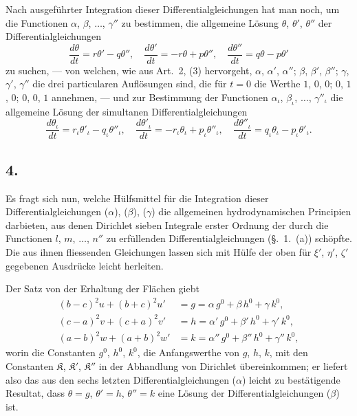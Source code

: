 \documentclass[12pt,a4paper]{article}
\begin{document}
Nach ausgeführter Integration dieser Differentialgleichungen hat man noch, um die Functionen $\alpha$, $\beta$, $\ldots$, $\gamma''$ zu bestimmen, die allgemeine Lösung $\theta$, $\theta'$, $\theta''$ der Differentialgleichungen
\begin{equation}
\tag{$\beta$}
\frac{d\theta}{dt} = r\theta' - q\theta'',\quad \frac{d\theta'}{dt} = -r\theta + p\theta'',\quad \frac{d\theta''}{dt} = q\theta - p\theta'
\end{equation}
zu suchen, --- von welchen, wie aus Art.~2, (3) hervorgeht, $\alpha$, $\alpha'$, $\alpha''$; $\beta$, $\beta'$, $\beta''$; $\gamma$, $\gamma'$, $\gamma''$ die drei particularen Auflösungen sind, die für $t=0$ die Werthe $1$, $0$, $0$; $0$, $1$, $0$; $0$, $0$, $1$ annehmen, --- und zur Bestimmung der Functionen $\alpha_\iota$, $\beta_\iota$, $\ldots$, $\gamma''_{\iota}$ die allgemeine Lösung der simultanen Differentialgleichungen
\begin{equation}
\tag{$\gamma$}
\frac{d\theta_\iota}{dt} = r_\iota\theta'_\iota - q_\iota\theta''_{\iota},\quad \frac{d\theta'_\iota}{dt} = -r_\iota\theta_\iota + p_\iota\theta''_{\iota},\quad \frac{d\theta''_{\iota}}{dt} = q_\iota\theta_\iota - p_\iota\theta'_\iota.
\end{equation}

\subsection*{4.}

Es fragt sich nun, welche Hülfsmittel für die Integration dieser Differentialgleichungen ($\alpha$), ($\beta$), ($\gamma$) die allgemeinen hydrodynamischen Principien darbieten, aus denen Dirichlet sieben Integrale erster Ordnung der durch die Functionen $l$, $m$, $\ldots$, $n''$ zu erfüllenden Differentialgleichungen (\S.~1.~(a)) schöpfte. Die aus ihnen fliessenden Gleichungen lassen sich mit Hülfe der oben für $\xi'$, $\eta'$, $\zeta'$ gegebenen Ausdrücke leicht herleiten.

Der Satz von der Erhaltung der Flächen giebt
\begin{equation}
\tag{1}
\begin{aligned}
(b-c)^2u + (b+c)^2u' &= g = \alpha\,g^0 + \beta\,h^0 + \gamma\,k^0,\\
(c-a)^2v + (c+a)^2v' &= h = \alpha'\,g^0 + \beta'\,h^0 + \gamma'\,k^0,\\
(a-b)^2w + (a+b)^2w' &= k = \alpha''\,g^0 + \beta''\,h^0 + \gamma''\,k^0,
\end{aligned}
\end{equation}
worin die Constanten $g^0$, $h^0$, $k^0$, die Anfangswerthe von $g$, $h$, $k$, mit den Constanten $\mathfrak{K}$, $\mathfrak{K}'$, $\mathfrak{K}''$ in der Abhandlung von Dirichlet übereinkommen; er liefert also das aus den sechs letzten Differentialgleichungen ($\alpha$) leicht zu bestätigende Resultat, dass $\theta = g$, $\theta' = h$, $\theta'' = k$ eine Lösung der Differentialgleichungen ($\beta$) ist.
\end{document}
